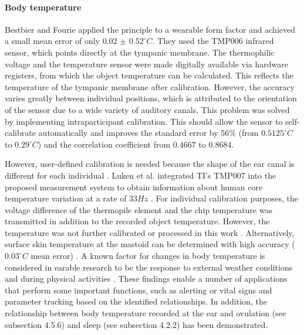 \paragraph{Body temperature}
\label{Background:SensingWithEarables:Physiological:BodyTemperature}
Bestbier and Fourie \cite{bestbierDevelopmentVitalSigns2018} applied the principle to a wearable form factor and achieved a small mean error of only $0.02$ $\pm$ $0.52 ^\circ C$. 
They used the TMP006 infrared sensor, which points directly at the tympanic membrane. 
The thermophilic voltage and the temperature sensor were made digitally available via hardware registers, from which the object temperature can be calculated. 
This reflects the temperature of the tympanic membrane after calibration.
However, the accuracy varies greatly between individual positions, which is attributed to the orientation of the sensor due to a wide variety of auditory canals.
This problem was solved by implementing intraparticipant calibration.
This should allow the sensor to self-calibrate automatically and improves the standard error by $56\%$ (from $0.5125 ^\circ C$ to $0.29 ^\circ C$) and the correlation coefficient from $0.4667$ to $0.8684$.

However, user-defined calibration is needed because the shape of the ear canal is different for each individual \cite{bestbierDevelopmentVitalSigns2018, luekenPhotoplethysmographybasedInearSensor2017, matsumotoEarbudtypeWearableHearable2019}.
Luken et al. integrated TI's TMP007 into the proposed measurement system to obtain information about human core temperature variation at a rate of $33 Hz$ \cite{luekenPhotoplethysmographybasedInearSensor2017}.
For individual calibration purposes, the voltage difference of the thermopile element and the chip temperature was transmitted in addition to the recorded object temperature.
However, the temperature was not further calibrated or processed in this work \cite{luekenPhotoplethysmographybasedInearSensor2017}.
Alternatively, surface skin temperature at the mastoid can be determined with high accuracy ($0.03 ^\circ C$ mean error) \cite{atallahErgonomicWearableCore2018}.
A known factor for changes in body temperature is considered in earable research to be the response to external weather conditions \cite{barralonAugmentedHearingAssistance2015, boanoNoninvasiveMeasurementCore2013, celikEvaluationBehindtheEarECG2016} and during physical activities \cite{boanoNoninvasiveMeasurementCore2013, chagllae.MeasurementCoreBody2018, celikEvaluationBehindtheEarECG2016, matsumotoEarbudtypeWearableHearable2019, sugimotoDevelopmentWirelessSensing2011}.
These findings enable a number of applications that perform some important functions, such as alerting or vital signs and parameter tracking based on the identified relationships.
In addition, the relationship between body temperature recorded at the ear and ovulation (see subsection 4.5.6) and sleep (see subsection 4.2.2) has been demonstrated.

